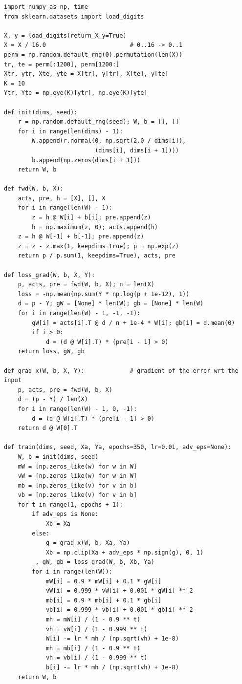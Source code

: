 \begin{lab}
\begin{verbatim}
import numpy as np, time
from sklearn.datasets import load_digits

X, y = load_digits(return_X_y=True)
X = X / 16.0                        # 0..16 -> 0..1
perm = np.random.default_rng(0).permutation(len(X))
tr, te = perm[:1200], perm[1200:]
Xtr, ytr, Xte, yte = X[tr], y[tr], X[te], y[te]
K = 10
Ytr, Yte = np.eye(K)[ytr], np.eye(K)[yte]

def init(dims, seed):
    r = np.random.default_rng(seed); W, b = [], []
    for i in range(len(dims) - 1):
        W.append(r.normal(0, np.sqrt(2.0 / dims[i]),
                          (dims[i], dims[i + 1])))
        b.append(np.zeros(dims[i + 1]))
    return W, b

def fwd(W, b, X):
    acts, pre, h = [X], [], X
    for i in range(len(W) - 1):
        z = h @ W[i] + b[i]; pre.append(z)
        h = np.maximum(z, 0); acts.append(h)
    z = h @ W[-1] + b[-1]; pre.append(z)
    z = z - z.max(1, keepdims=True); p = np.exp(z)
    return p / p.sum(1, keepdims=True), acts, pre

def loss_grad(W, b, X, Y):
    p, acts, pre = fwd(W, b, X); n = len(X)
    loss = -np.mean(np.sum(Y * np.log(p + 1e-12), 1))
    d = p - Y; gW = [None] * len(W); gb = [None] * len(W)
    for i in range(len(W) - 1, -1, -1):
        gW[i] = acts[i].T @ d / n + 1e-4 * W[i]; gb[i] = d.mean(0)
        if i > 0:
            d = (d @ W[i].T) * (pre[i - 1] > 0)
    return loss, gW, gb

def grad_x(W, b, X, Y):             # gradient of the error wrt the input
    p, acts, pre = fwd(W, b, X)
    d = (p - Y) / len(X)
    for i in range(len(W) - 1, 0, -1):
        d = (d @ W[i].T) * (pre[i - 1] > 0)
    return d @ W[0].T

def train(dims, seed, Xa, Ya, epochs=350, lr=0.01, adv_eps=None):
    W, b = init(dims, seed)
    mW = [np.zeros_like(w) for w in W]
    vW = [np.zeros_like(w) for w in W]
    mb = [np.zeros_like(v) for v in b]
    vb = [np.zeros_like(v) for v in b]
    for t in range(1, epochs + 1):
        if adv_eps is None:
            Xb = Xa
        else:
            g = grad_x(W, b, Xa, Ya)
            Xb = np.clip(Xa + adv_eps * np.sign(g), 0, 1)
        _, gW, gb = loss_grad(W, b, Xb, Ya)
        for i in range(len(W)):
            mW[i] = 0.9 * mW[i] + 0.1 * gW[i]
            vW[i] = 0.999 * vW[i] + 0.001 * gW[i] ** 2
            mb[i] = 0.9 * mb[i] + 0.1 * gb[i]
            vb[i] = 0.999 * vb[i] + 0.001 * gb[i] ** 2
            mh = mW[i] / (1 - 0.9 ** t)
            vh = vW[i] / (1 - 0.999 ** t)
            W[i] -= lr * mh / (np.sqrt(vh) + 1e-8)
            mh = mb[i] / (1 - 0.9 ** t)
            vh = vb[i] / (1 - 0.999 ** t)
            b[i] -= lr * mh / (np.sqrt(vh) + 1e-8)
    return W, b


\end{verbatim}
\end{lab}
